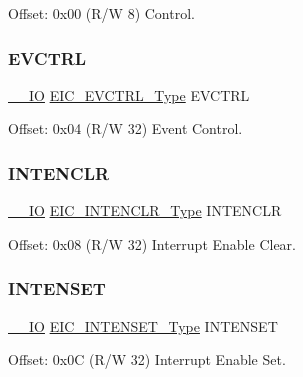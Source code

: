 Offset\+: 0x00 (R/W 8) Control. 

\mbox{\label{struct_eic_a2a8a3f11520e68984482b92a83f5c480}} 
\subsubsection{\texorpdfstring{EVCTRL}{EVCTRL}}
{\footnotesize\ttfamily \mbox{\hyperlink{core__cm0plus_8h_aec43007d9998a0a0e01faede4133d6be}{\+\_\+\+\_\+\+IO}} \mbox{\hyperlink{union_e_i_c___e_v_c_t_r_l___type}{E\+I\+C\+\_\+\+E\+V\+C\+T\+R\+L\+\_\+\+Type}} E\+V\+C\+T\+RL}



Offset\+: 0x04 (R/W 32) Event Control. 

\mbox{\label{struct_eic_adb470536bf51d4bf9373eafef91f0017}} 
\subsubsection{\texorpdfstring{INTENCLR}{INTENCLR}}
{\footnotesize\ttfamily \mbox{\hyperlink{core__cm0plus_8h_aec43007d9998a0a0e01faede4133d6be}{\+\_\+\+\_\+\+IO}} \mbox{\hyperlink{union_e_i_c___i_n_t_e_n_c_l_r___type}{E\+I\+C\+\_\+\+I\+N\+T\+E\+N\+C\+L\+R\+\_\+\+Type}} I\+N\+T\+E\+N\+C\+LR}



Offset\+: 0x08 (R/W 32) Interrupt Enable Clear. 

\mbox{\label{struct_eic_a0be003d42a915e612f605948e929f416}} 
\subsubsection{\texorpdfstring{INTENSET}{INTENSET}}
{\footnotesize\ttfamily \mbox{\hyperlink{core__cm0plus_8h_aec43007d9998a0a0e01faede4133d6be}{\+\_\+\+\_\+\+IO}} \mbox{\hyperlink{union_e_i_c___i_n_t_e_n_s_e_t___type}{E\+I\+C\+\_\+\+I\+N\+T\+E\+N\+S\+E\+T\+\_\+\+Type}} I\+N\+T\+E\+N\+S\+ET}



Offset\+: 0x0C (R/W 32) Interrupt Enable Set. 

\mbox{\label{struct_eic_a594641dd707e461963d9b7ce17b10dd9}} 
